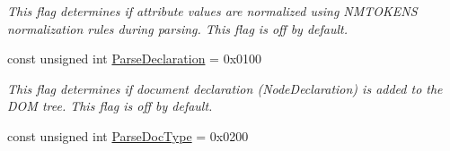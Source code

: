 \begin{DoxyCompactItemize}
\begin{DoxyCompactList}\small\item\em This flag determines if attribute values are normalized using NMTOKENS normalization rules during parsing. This flag is off by default. \item\end{DoxyCompactList}\item 
\hypertarget{namespacephys_1_1xml_a463f15fc43d69ab835c8598826f65646}{
const unsigned int \hyperlink{namespacephys_1_1xml_a463f15fc43d69ab835c8598826f65646}{ParseDeclaration} = 0x0100}
\label{d9/d27/namespacephys_1_1xml_a463f15fc43d69ab835c8598826f65646}

\begin{DoxyCompactList}\small\item\em This flag determines if document declaration (NodeDeclaration) is added to the DOM tree. This flag is off by default. \item\end{DoxyCompactList}\item 
\hypertarget{namespacephys_1_1xml_adf5ee79dc4c200ad85b64a8308b0c805}{
const unsigned int \hyperlink{namespacephys_1_1xml_adf5ee79dc4c200ad85b64a8308b0c805}{ParseDocType} = 0x0200}
\label{d9/d27/namespacephys_1_1xml_adf5ee79dc4c200ad85b64a8308b0c805}


\end{DoxyCompactItemize}
